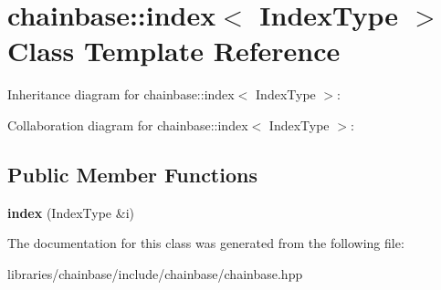 \hypertarget{classchainbase_1_1index}{}\section{chainbase\+:\+:index$<$ Index\+Type $>$ Class Template Reference}
\label{classchainbase_1_1index}


Inheritance diagram for chainbase\+:\+:index$<$ Index\+Type $>$\+:


Collaboration diagram for chainbase\+:\+:index$<$ Index\+Type $>$\+:
\subsection*{Public Member Functions}
\begin{DoxyCompactItemize}
\item 
\mbox{\label{classchainbase_1_1index_a4f399fcc75f83eb11185bc71ba0b77ce}} 
{\bfseries index} (Index\+Type \&i)
\end{DoxyCompactItemize}


The documentation for this class was generated from the following file\+:\begin{DoxyCompactItemize}
\item 
libraries/chainbase/include/chainbase/chainbase.\+hpp\end{DoxyCompactItemize}

